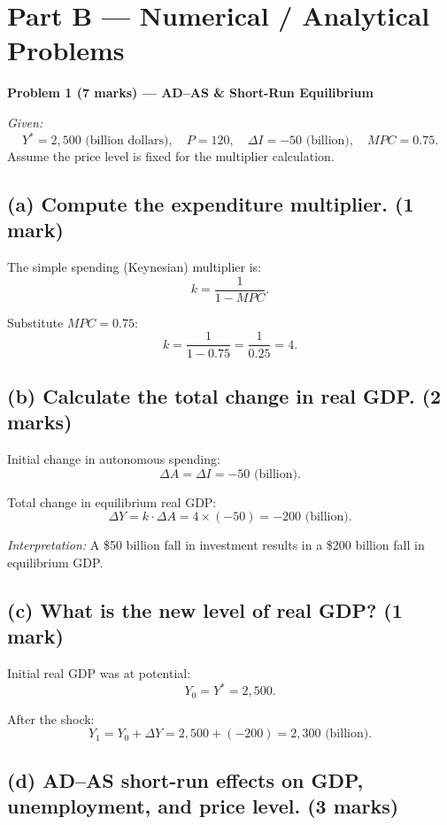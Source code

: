 \documentclass[12pt]{article}
\begin{document}
\section*{Part B --- Numerical / Analytical Problems}

\textbf{Problem 1 (7 marks) --- AD--AS \& Short-Run Equilibrium}

\textit{Given:}
\[
Y^* = 2{,}500 \text{ (billion dollars)}, \quad P = 120, \quad \Delta I = -50 \text{ (billion)}, \quad MPC = 0.75.
\]
Assume the price level is fixed for the multiplier calculation.

\subsection*{(a) Compute the expenditure multiplier. (1 mark)}

The simple spending (Keynesian) multiplier is:
\[
k = \frac{1}{1 - MPC}.
\]

Substitute \(MPC = 0.75\):
\[
k = \frac{1}{1 - 0.75} = \frac{1}{0.25} = \boxed{4}.
\]

\subsection*{(b) Calculate the total change in real GDP. (2 marks)}

Initial change in autonomous spending:
\[
\Delta A = \Delta I = -50 \text{ (billion)}.
\]

Total change in equilibrium real GDP:
\[
\Delta Y = k \cdot \Delta A = 4 \times (-50) = \boxed{-200 \text{ (billion)}}.
\]

\textit{Interpretation:} A \$50 billion fall in investment results in a \$200 billion fall in equilibrium GDP.

\subsection*{(c) What is the new level of real GDP? (1 mark)}

Initial real GDP was at potential:
\[
Y_0 = Y^* = 2{,}500.
\]

After the shock:
\[
Y_1 = Y_0 + \Delta Y = 2{,}500 + (-200) = \boxed{2{,}300 \text{ (billion)}}.
\]

\subsection*{(d) AD--AS short-run effects on GDP, unemployment, and price level. (3 marks)}
\end{document}
